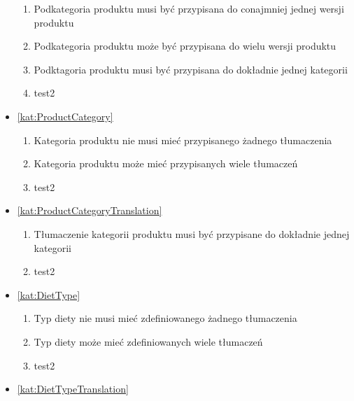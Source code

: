 \begin{itemize}[label={\textbf{Reguły dla}}, wide, labelwidth=!, labelindent=0pt]
    \begin{enumerate}[label={\textbf{REG/\protect\threedigits{\arabic{enumi}}}}, wide, labelwidth=!, align=left, leftmargin=3cm, resume]
        \item Podkategoria produktu musi być przypisana do conajmniej jednej wersji produktu
        \item Podkategoria produktu może być przypisana do wielu wersji produktu
        \item Podktagoria produktu musi być przypisana do dokładnie jednej kategorii
        \item test2
    \end{enumerate}
    \item\ref{kat:ProductCategory}
    \begin{enumerate}[label={\textbf{REG/\protect\threedigits{\arabic{enumi}}}}, wide, labelwidth=!, align=left, leftmargin=3cm, resume]
        \item Kategoria produktu nie musi mieć przypisanego żadnego tłumaczenia
        \item Kategoria produktu może mieć przypisanych wiele tłumaczeń
        \item test2
    \end{enumerate}
    \item\ref{kat:ProductCategoryTranslation}
    \begin{enumerate}[label={\textbf{REG/\protect\threedigits{\arabic{enumi}}}}, wide, labelwidth=!, align=left, leftmargin=3cm, resume]
        \item Tłumaczenie kategorii produktu musi być przypisane do dokładnie jednej kategorii
        \item test2
    \end{enumerate}
    \item\ref{kat:DietType}
    \begin{enumerate}[label={\textbf{REG/\protect\threedigits{\arabic{enumi}}}}, wide, labelwidth=!, align=left, leftmargin=3cm, resume]
        \item Typ diety nie musi mieć zdefiniowanego żadnego tłumaczenia
        \item Typ diety może mieć zdefiniowanych wiele tłumaczeń
        \item test2
    \end{enumerate}
    \item\ref{kat:DietTypeTranslation}
    \begin{enumerate}[label={\textbf{REG/\protect\threedigits{\arabic{enumi}}}}, wide, labelwidth=!, align=left, leftmargin=3cm, resume]

\end{enumerate}
\end{itemize}
